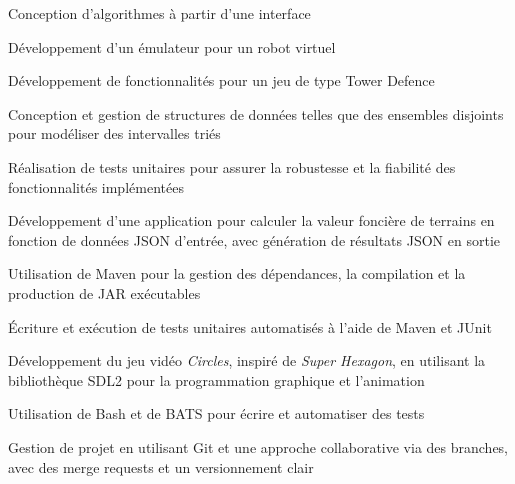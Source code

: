 \documentclass[letterpaper,10pt]{article}
\begin{document}
  \begin{resume_list}
    \item Conception d’algorithmes à partir d'une interface
    \vspace{2pt}
    \item Développement d’un émulateur pour un robot virtuel
    \vspace{2pt}
    \item Développement de fonctionnalités pour un jeu de type Tower Defence
    \vspace{2pt}
    \item Conception et gestion de structures de données telles que des ensembles disjoints pour modéliser des intervalles triés
    \vspace{2pt}
    \item Réalisation de tests unitaires pour assurer la robustesse et la fiabilité des fonctionnalités implémentées
    
  \end{resume_list}

  \begin{resume_list}
    \item Développement d’une application pour calculer la valeur foncière de terrains en fonction de données JSON d’entrée, avec génération de résultats JSON en sortie
    \vspace{2pt}
    \item Utilisation de Maven pour la gestion des dépendances, la compilation et la production de JAR exécutables
    \vspace{2pt}
    \item Écriture et exécution de tests unitaires automatisés à l'aide de Maven et JUnit
  \end{resume_list}
  
  \begin{resume_list}
    \item Développement du jeu vidéo \textit{Circles}, inspiré de \textit{Super Hexagon}, en utilisant la bibliothèque SDL2 pour la programmation graphique et l’animation
    \vspace{2pt}
    \item Utilisation de Bash et de BATS pour écrire et automatiser des tests
    \vspace{2pt}
    \item Gestion de projet en utilisant Git et une approche collaborative via des branches, avec des merge requests et un versionnement clair
  \end{resume_list}
  
\end{document}
